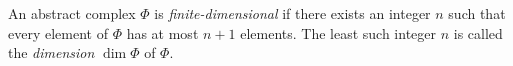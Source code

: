 An abstract complex $\Phi$ is \textit{finite-dimensional} if there exists an integer $n$ such that every element of $\Phi$ has at most $n+1$ elements. The least such integer $n$ is called the \textit{dimension} $\dim \Phi$ of $\Phi$.
